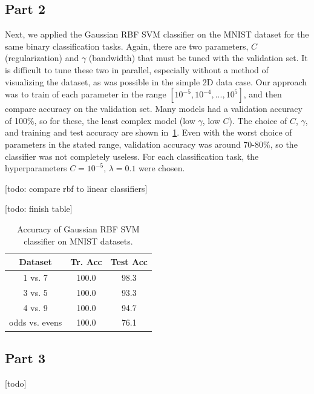 \subsection{Part 2}
Next, we applied the Gaussian RBF SVM classifier on the MNIST dataset for the same binary classification tasks.
Again, there are two parameters, $C$ (regularization) and $\gamma$ (bandwidth) that must be tuned with the validation set.
It is difficult to tune these two in parallel, especially without a method of visualizing the dataset, as was possible in the simple 2D data case.
Our approach was to train of each parameter in the range $[10^{-5}, 10^{-4}, ..., 10^{5}]$, and then compare accuracy on the validation set.
Many models had a validation accuracy of 100\%, so for these, the least complex model (low $\gamma$, low $C$).
The choice of $C$, $\gamma$, and training and test accuracy are shown in~\cref{table_4_2}.
Even with the worst choice of parameters in the stated range, validation accuracy was around 70-80\%, so the classifier was not completely useless.
For each classification task, the hyperparameters $C=10^{-5}$, $\lambda=0.1$ were chosen.


[todo: compare rbf to linear classifiers]

[todo: finish table]

\begin{table}[ht!]
\centering
\begin{tabular}{||c c c||}  
 \hline
 Dataset & Tr. Acc & Test Acc \\ [0.3ex] 
 \hline\hline
 1 vs. 7 & 100.0 & 98.3 \\ 
 \hline
 3 vs. 5 & 100.0 & 93.3 \\ 
 \hline
 4 vs. 9 & 100.0 & 94.7 \\ 
 \hline
 odds vs. evens & 100.0 & 76.1 \\ 
 \hline
\end{tabular}
\caption{Accuracy of Gaussian RBF SVM classifier on MNIST datasets.}
\label{table_4_2}
\end{table}

\subsection{Part 3}
[todo]

